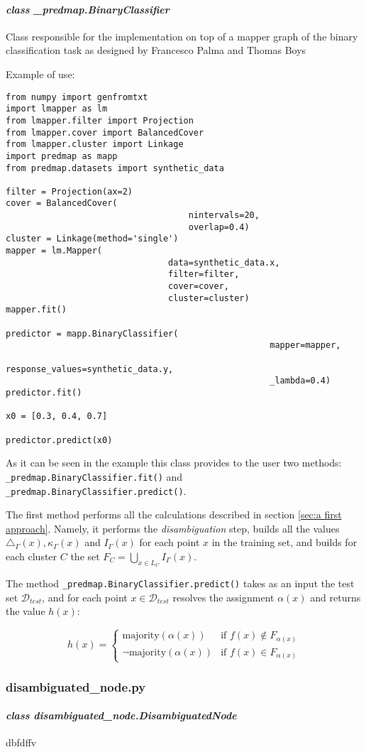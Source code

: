 \paragraph{\textit{class \_predmap.BinaryClassifier}}
Class responsible for the implementation on top of a mapper graph of the binary
classification task as designed by Francesco Palma and Thomas Boys

Example of use:
\begin{lstlisting}[style=mystyle, deletekeywords={filter}]
from numpy import genfromtxt
import lmapper as lm
from lmapper.filter import Projection
from lmapper.cover import BalancedCover
from lmapper.cluster import Linkage
import predmap as mapp
from predmap.datasets import synthetic_data

filter = Projection(ax=2)
cover = BalancedCover(
									nintervals=20,
									overlap=0.4)
cluster = Linkage(method='single')
mapper = lm.Mapper(
								data=synthetic_data.x,
								filter=filter,
								cover=cover,
								cluster=cluster)
mapper.fit()

predictor = mapp.BinaryClassifier(
													mapper=mapper,
													response_values=synthetic_data.y,
													_lambda=0.4)
predictor.fit()

x0 = [0.3, 0.4, 0.7]

predictor.predict(x0)
\end{lstlisting}
As it can be seen in the example this class provides to the user two methods: \lstinline|_predmap.BinaryClassifier.fit()| and \lstinline|_predmap.BinaryClassifier.predict()|. 

The first method performs all the calculations described in section \ref{sec:a first approach}. Namely, it performs the \textit{disambiguation} step, builds all the values $\triangle_\Gamma(x), \kappa_\Gamma(x)$ and $I_\Gamma(x)$ for each point $x$ in the training set, and builds for each cluster $C$ the set $F_C=\bigcup_{x\in L_C} I_\Gamma(x)$. 

The method \lstinline|_predmap.BinaryClassifier.predict()| takes as an input the test set $\mathcal D_{test}$, and for each point $x\in \mathcal D_{test}$ resolves the assignment $\alpha(x)$ and returns the value $h(x)$:

$$h(x) = \begin{cases}
\text{majority}(\alpha(x))& \text{if } f(x)\notin F_{\alpha(x)}\\
\lnot\text{majority}(\alpha(x))& \text{if } f(x)\in F_{\alpha(x)}
\end{cases}$$

\subsubsection{disambiguated\_node.py}
\paragraph{\textit{class disambiguated\_node.DisambiguatedNode}}dbfdffv
